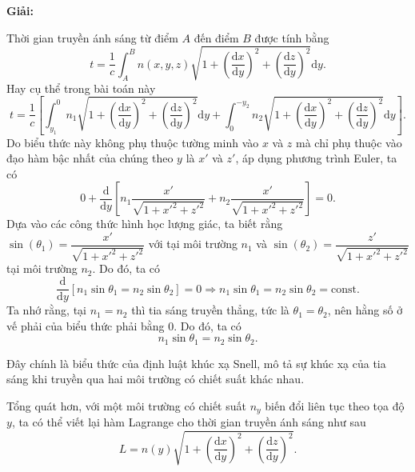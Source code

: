 \textbf{Giải:} 

Thời gian truyền ánh sáng từ điểm \(A\) đến điểm \(B\) được tính bằng
\begin{equation}
    t = \dfrac{1}{c} \int_{A}^{B} n(x,y,z) \sqrt{1 + \left( \dfrac{\mathrm{d} x}{\mathrm{d} y}\right)^2 + \left( \dfrac{\mathrm{d} z}{\mathrm{d} y}\right)^2} \mathrm{d}y.
\end{equation}
Hay cụ thể trong bài toán này
\begin{equation}
    t = \dfrac{1}{c} \left[ \int_{y_1}^{0} n_1 \sqrt{1 + \left( \dfrac{\mathrm{d} x}{\mathrm{d} y}\right)^2 + \left( \dfrac{\mathrm{d} z}{\mathrm{d} y}\right)^2} \mathrm{d}y + \int_{0}^{-y_2} n_2 \sqrt{1 + \left( \dfrac{\mathrm{d} x}{\mathrm{d} y}\right)^2 + \left( \dfrac{\mathrm{d} z}{\mathrm{d} y}\right)^2} \mathrm{d}y \right] .
\end{equation}
Do biểu thức này không phụ thuộc tường minh vào \(x\) và \(z\) mà chỉ phụ thuộc vào đạo hàm bậc nhất của chúng theo \(y\) là \(x'\) và \(z'\), áp dụng phương trình Euler, ta có
\begin{equation}
    0 + \dfrac{\mathrm{d}}{\mathrm{d}y} \left[ n_1 \dfrac{x'}{\sqrt{1+x'^2+z'^2}}  + n_2 \dfrac{x'}{\sqrt{1+x'^2+z'^2}} \right] = 0.
\end{equation}
Dựa vào các công thức hình học lượng giác, ta biết rằng \(\sin \left( \theta_1 \right) = \dfrac{x'}{\sqrt{1+x'^2+z'^2}} \) với tại môi trường \(n_1\) và \(\sin \left( \theta_2 \right) = \dfrac{z'}{\sqrt{1+x'^2+z'^2}} \) tại môi trường \(n_2\). Do đó, ta có
\begin{equation}
    \dfrac{\mathrm{d}}{\mathrm{d}y} \left[ n_1 \sin \theta_1 = n_2 \sin \theta_2 \right] = 0 \Rightarrow n_1 \sin \theta_1 = n_2 \sin \theta_2 = \text{const}.
\end{equation}
Ta nhớ rằng, tại \(n_1 = n_2\) thì tia sáng truyền thẳng, tức là \(\theta_1 = \theta_2\), nên hằng số ở vế phải của biểu thức phải bằng 0. Do đó, ta có
\begin{equation}    
    n_1 \sin \theta_1 = n_2 \sin \theta_2.
\end{equation}

Đây chính là biểu thức của định luật khúc xạ Snell, mô tả sự khúc xạ của tia sáng khi truyền qua hai môi trường có chiết suất khác nhau.

Tổng quát hơn, với một môi trường có chiết suất \(n_y\) biến đổi liên tục theo tọa độ \(y\), ta có thể viết lại hàm Lagrange cho thời gian truyền ánh sáng như sau
\begin{equation}
    L = n(y) \sqrt{1 + \left( \dfrac{\mathrm{d} x}{\mathrm{d} y}\right)^2 + \left( \dfrac{\mathrm{d} z}{\mathrm{d} y}\right)^2}.
\end{equation}

